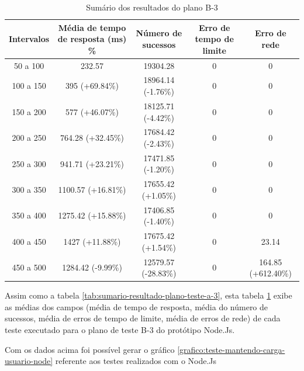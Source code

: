   \begin{table}[H]
    \centering
    \footnotesize
    \setlength{\abovecaptionskip}{0pt}
    \setlength{\belowcaptionskip}{0pt}
    \caption[Sumário dos resultados do plano B-3]{Sumário dos resultados do plano B-3}
    \label{tab:sumario-resultado-plano-teste-b-3}
    \begin{tabular}{c|c|c|c|c}
      \hline \hline
      Intervalos  & 	Média de tempo de resposta (ms) \% &	Número de sucessos & 	Erro de tempo de limite &	Erro de rede \\ 
      \hline \hline
      50 a 100 &		232.57  &			19304.28 &	 		0 &			0 \\
      100 a 150&		395 (+69.84\%)&			18964.14 (-1.76\%)&		0 &			0 \\
      150 a 200&		577 (+46.07\%)&			18125.71 (-4.42\%)& 		0 &			0 \\
      200 a 250&		764.28 (+32.45\%)&		17684.42 (-2.43\%)& 		0 &			0 \\
      250 a 300&		941.71 (+23.21\%)&		17471.85 (-1.20\%)& 		0 &			0 \\
      300 a 350&		1100.57 (+16.81\%)&		17655.42 (+1.05\%)& 		0 &			0 \\
      350 a 400&		1275.42 (+15.88\%)&		17406.85 (-1.40\%)& 		0 &			0 \\
      400 a 450&		1427 (+11.88\%)&		17675.42 (+1.54\%)& 		0 &			23.14 \\
      450 a 500&		1284.42 (-9.99\%)&		12579.57 (-28.83\%)& 		0 &			164.85 (+612.40\%)\\
      \hline \hline
    \end{tabular}
  \end{table}
   
  Assim como a tabela \ref{tab:sumario-resultado-plano-teste-a-3}, esta tabela \ref{tab:sumario-resultado-plano-teste-b-3} exibe as médias 
  dos campos (média de tempo de resposta, média do número de sucessos, média de erros de tempo de limite, média de erros de rede) 
  de cada teste executado para o plano de teste B-3 do protótipo Node.Js.
  
  Com os dados acima foi possível gerar o gráfico \ref{grafico:teste-mantendo-carga-usuario-node} referente aos testes 
  realizados com o Node.Js

